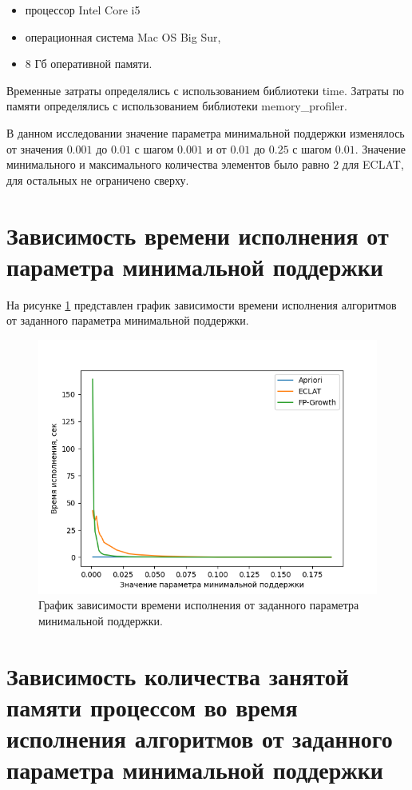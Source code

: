 \documentclass[12pt]{report}
\begin{document}
\begin{itemize}
\item процессор Intel Core i5
\item операционная система Mac OS Big Sur,
\item 8 Гб оперативной памяти.
\end{itemize}

Временные затраты определялись с использованием библиотеки time. Затраты по памяти определялись с использованием библиотеки memory\_profiler.

В данном исследовании значение параметра минимальной поддержки изменялось от значения $0.001$ до $0.01$ с шагом $0.001$ и от $0.01$ до $0.25$ с шагом $0.01$. Значение минимального и максимального количества элементов было равно $2$ для ECLAT, для остальных не ограничено сверху.

\section{Зависимость времени исполнения от параметра минимальной поддержки}

На рисунке \ref{img:time} представлен график зависимости времени исполнения алгоритмов от заданного параметра минимальной поддержки.

\begin{figure}[H]
	\centering
	\includegraphics[width=\textwidth]{time.png}
	\caption{ График зависимости времени исполнения от заданного параметра минимальной поддержки.}
	\label{img:time}
\end{figure}


\section{Зависимость количества занятой памяти процессом во время исполнения алгоритмов от заданного параметра минимальной поддержки}
\end{document}
